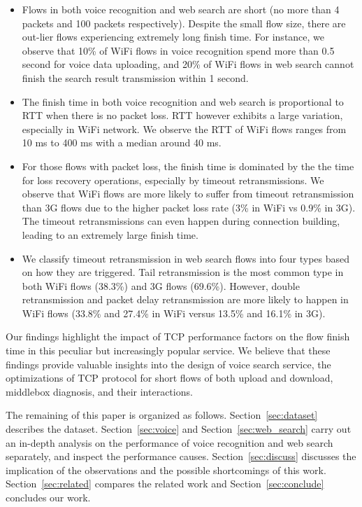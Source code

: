 

\begin{itemize}
\item Flows in both voice recognition and web search are short (no more than 4 packets and 100 packets respectively). Despite the small flow size, there are out-lier flows experiencing extremely long finish time. For instance, we observe that 10\% of WiFi flows in voice recognition spend more than 0.5 second for voice data uploading, and 20\% of WiFi flows in web search cannot finish the search result transmission within 1 second.

\item The finish time in both voice recognition and web search is proportional to RTT when there is no packet loss. RTT however exhibits a large variation, especially in WiFi network. We observe the RTT of WiFi flows ranges from 10 ms to 400 ms with a median around 40 ms. 

\item For those flows with packet loss, the finish time is dominated by the the time for loss recovery operations, especially by timeout retransmissions. We observe that WiFi flows are more likely to suffer from timeout retransmission than 3G flows due to the higher packet loss rate (3\% in WiFi vs 0.9\% in 3G). The timeout retransmissions can even happen during connection building, leading to an extremely large finish time.

\item We classify timeout retransmission in web search flows into four types based on how they are triggered. Tail retransmission is the most common type in both WiFi flows (38.3\%) and 3G flows (69.6\%). However, double retransmission and packet delay retransmission are more likely to happen in WiFi flows (33.8\% and 27.4\% in WiFi versus 13.5\% and 16.1\% in 3G).

\end{itemize}

Our findings highlight the impact of TCP performance factors on the flow finish time in this peculiar but increasingly popular service. We believe that these findings provide valuable insights into the design of voice search service, the optimizations of TCP protocol for short flows of both upload and download, middlebox diagnosis, and their interactions.

The remaining of this paper is organized as follows. Section~\ref{sec:dataset} describes the dataset. Section~\ref{sec:voice} and Section~\ref{sec:web_search} carry out an in-depth analysis on the performance of voice recognition and web search separately, and inspect the performance causes. Section~\ref{sec:discuss} discusses the implication of the observations and the possible shortcomings of this work. Section~\ref{sec:related} compares the related work and Section~\ref{sec:conclude} concludes our work. 
